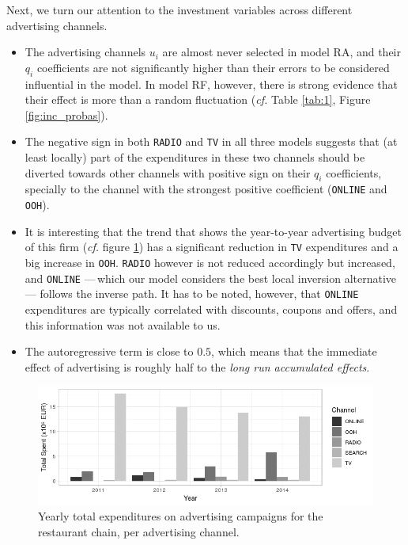 Next, we turn our attention to the investment variables across different advertising channels.

\begin{itemize}

\item The advertising channels $u_i$ are almost never selected in model RA, and their $q_i$ coefficients are not significantly higher than their errors to be considered influential in the model. In model RF, however, there is strong evidence that their effect is more than a random fluctuation (\emph{cf.} Table \ref{tab:1}, Figure \ref{fig:inc_probas}). 
\item The negative sign in both \texttt{RADIO} and \texttt{TV} in all three models suggests that (at least locally) part of the expenditures in these two channels should be diverted towards other channels with positive sign on their $q_i$ coefficients, specially to the channel with the strongest positive coefficient (\texttt{ONLINE} and \texttt{OOH}).
\item It is interesting that the trend that shows the year-to-year advertising budget of this firm (\emph{cf.} figure \ref{fig:yearly}) has a significant reduction in \texttt{TV} expenditures and a big increase in \texttt{OOH}. \texttt{RADIO} however is not reduced accordingly but increased, and \texttt{ONLINE} ---\,which our model considers the best local inversion alternative\,--- follows the inverse path. It has to be noted, however, that \texttt{ONLINE} expenditures are typically correlated with discounts, coupons and offers, and this information was not available to us.
\item The autoregressive term is close to $0.5$, which means that the immediate effect of advertising is roughly half to the \textit{long run accumulated effects}.
\end{itemize}


\begin{figure}[h]
\centering
\includegraphics[scale=0.75]{figures/anuales}
\caption{Yearly total expenditures on advertising campaigns for the restaurant chain, per advertising channel.}\label{fig:yearly}
\end{figure}






